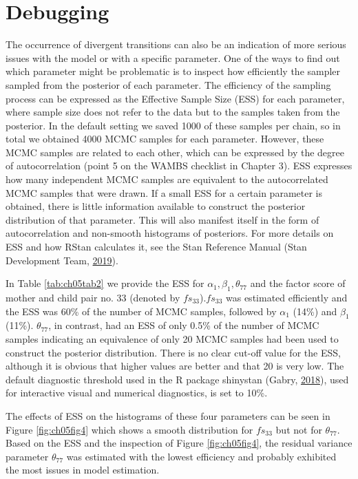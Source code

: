 \documentclass[openright,titlepage,12pt,a4paper]{book}
\begin{document}
\hypertarget{debugging}{%
\section{Debugging}\label{debugging}}

The occurrence of divergent transitions can also be an indication of more serious issues with the model or with a specific parameter. One of the ways to find out which parameter might be problematic is to inspect how efficiently the sampler sampled from the posterior of each parameter. The efficiency of the sampling process can be expressed as the Effective Sample Size (ESS) for each parameter, where sample size does not refer to the data but to the samples taken from the posterior. In the default setting we saved 1000 of these samples per chain, so in total we obtained 4000 MCMC samples for each parameter. However, these MCMC samples are related to each other, which can be expressed by the degree of autocorrelation (point 5 on the WAMBS checklist in Chapter 3). ESS expresses how many independent MCMC samples are equivalent to the autocorrelated MCMC samples that were drawn. If a small ESS for a certain parameter is obtained, there is little information available to construct the posterior distribution of that parameter. This will also manifest itself in the form of autocorrelation and non-smooth histograms of posteriors. For more details on ESS and how RStan calculates it, see the Stan Reference Manual (Stan Development Team, \protect\hyperlink{ref-stan_development_team_stan_2019}{2019}).

In Table \ref{tab:ch05tab2} we provide the ESS for \(\alpha_1, \beta_1, \theta_{77}\) and the factor score of mother and child pair no. 33 (denoted by \(fs_{33}\)).\(fs_{33}\) was estimated efficiently and the ESS was 60\% of the number of MCMC samples, followed by \(\alpha_1\) (14\%) and \(\beta_1\) (11\%). \(\theta_{77}\), in contrast, had an ESS of only 0.5\% of the number of MCMC samples indicating an equivalence of only 20 MCMC samples had been used to construct the posterior distribution. There is no clear cut-off value for the ESS, although it is obvious that higher values are better and that 20 is very low. The default diagnostic threshold used in the R package shinystan (Gabry, \protect\hyperlink{ref-gabry_shinystan:_2018}{2018}), used for interactive visual and numerical diagnostics, is set to 10\%.

The effects of ESS on the histograms of these four parameters can be seen in Figure \ref{fig:ch05fig4} which shows a smooth distribution for \(fs_{33}\) but not for \(\theta_{77}\). Based on the ESS and the inspection of Figure \ref{fig:ch05fig4}, the residual variance parameter \(\theta_{77}\) was estimated with the lowest efficiency and probably exhibited the most issues in model estimation.
\end{document}
